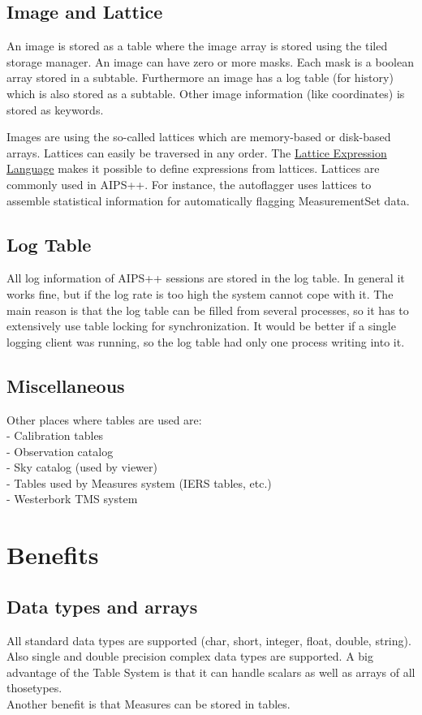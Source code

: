 \subsection{Image and Lattice}
An image is stored as a table where the image array is stored using
the tiled storage manager. An image can have zero or more masks. Each
mask is a boolean array stored in a subtable. Furthermore an image has
a log table (for history) which is also stored as a subtable. Other
image information (like coordinates) is stored as keywords.

Images are using the so-called lattices which are memory-based or
disk-based arrays. Lattices can easily be traversed in any order.
The \href{223.html}{Lattice Expression Language}
makes it possible to define expressions from lattices.
Lattices are commonly used in AIPS++. For instance, the autoflagger
uses lattices to assemble statistical information for automatically
flagging MeasurementSet data.

\subsection{Log Table}
All log information of AIPS++ sessions are stored in the log table.
In general it works fine, but if the log rate is too high the system
cannot cope with it. The main reason is that the log table can be
filled from several processes, so it has to extensively use table
locking for synchronization. It would be better if a single logging
client was running, so the log table had only one process writing into
it.

\subsection{Miscellaneous}
Other places where tables are used are:
\\- Calibration tables
\\- Observation catalog
\\- Sky catalog (used by viewer)
\\- Tables used by Measures system (IERS tables, etc.)
\\- Westerbork TMS system

\section{Benefits}
\subsection{Data types and arrays}
All standard data types are supported (char, short, integer, float,
double, string).
Also single and double precision complex data types are supported.
A big advantage of the Table System is that it can handle scalars as well
as arrays of all thosetypes.
\\Another benefit is that Measures can be stored in tables.


